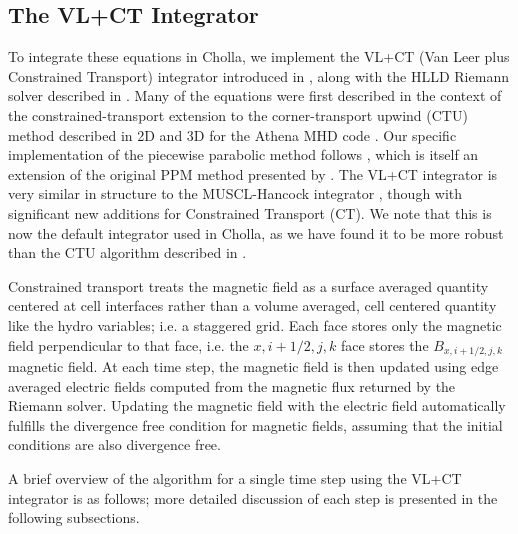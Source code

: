 \documentclass[modern]{aastex631}
\begin{document}
\subsection{The VL+CT Integrator}
\label{sec:vlct-summary}

To integrate these equations in Cholla, we implement the VL+CT (Van Leer plus Constrained Transport) integrator introduced in \cite{stone_2009}, along with the HLLD Riemann solver described in \cite{hlld_2005}. Many of the equations were first described in the context of the constrained-transport extension to the corner-transport upwind (CTU) method \citep{colella_1990} described in 2D \citep{gardiner_2005} and 3D \citep{gardiner_unsplit_2008} for the Athena MHD code \citep{stone_athena_2008}. Our specific implementation of the piecewise parabolic method follows \cite{felker_2018}, which is itself an extension of the original PPM method presented by \cite{colella_1984}. The VL+CT integrator is very similar in structure to the MUSCL-Hancock integrator \citep{van_leer_2006, falle_1991, Toro}, though with significant new additions for Constrained Transport (CT). We note that this is now the default integrator used in Cholla, as we have found it to be more robust than the CTU algorithm described in \cite{schneider_2015}.

Constrained transport treats the magnetic field as a surface averaged quantity centered at cell interfaces rather than a volume averaged, cell centered quantity like the hydro variables; i.e. a staggered grid. Each face stores only the magnetic field perpendicular to that face, i.e. the $x,i+1/2,j,k$ face stores the $B_{x,i+1/2,j,k}$ magnetic field. At each time step, the magnetic field is then updated using edge averaged electric fields computed from the magnetic flux returned by the Riemann solver. Updating the magnetic field with the electric field automatically fulfills the divergence free condition for magnetic fields, assuming that the initial conditions are also divergence free.

A brief overview of the algorithm for a single time step using the VL+CT integrator is as follows; more detailed discussion of each step is presented in the following subsections.
\end{document}
